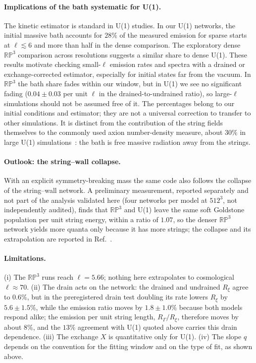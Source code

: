 \documentclass[prd,twocolumn,superscriptaddress,nofootinbib,amsmath,amssymb]{revtex4-2}
\newcommand{\RP}{\mathbb{RP}^3}
\newcommand{\RG}{R_\Gamma}
\newcommand{\Rxi}{R_\xi}
\begin{document}
\paragraph{Implications of the bath systematic for U(1).}
The kinetic estimator is standard in U(1) studies.
In our U(1) networks, the initial massive bath accounts for $28\%$ of the measured emission for sparse starts at $\ell\lesssim6$ and more than half in the dense comparison. The exploratory dense $\RP$ comparison across resolutions suggests a similar share to dense U(1). These results motivate checking small-$\ell$ emission rates and spectra with a drained or exchange-corrected estimator, especially for initial states far from the vacuum.
In $\RP$ the bath share fades within our window, but in U(1) we see no significant fading ($0.04\pm0.03$ per unit $\ell$ in the drained-to-undrained ratio), so large-$\ell$ simulations should not be assumed free of it. The percentages belong to our initial conditions and estimator; they are not a universal correction to transfer to other simulations.
It is distinct from the contribution of the string fields themselves to the commonly used axion number-density measure, about $30\%$ in large U(1) simulations~\cite{Correia2025spectrum}: the bath is free massive radiation away from the strings.

\paragraph{Outlook: the string--wall collapse.}
With an explicit symmetry-breaking mass the same code also follows the collapse of the string--wall network. A preliminary measurement, reported separately and not part of the analysis validated here (four networks per model at $512^3$, not independently audited), finds that $\RP$ and U(1) leave the same soft Goldstone population per unit string energy, within a ratio of $1.07$, so the denser $\RP$ network yields more quanta only because it has more strings; the collapse and its extrapolation are reported in Ref.~\cite{whalefall_repo}.

\paragraph{Limitations.}
(i) The $\RP$ runs reach $\ell=5.66$; nothing here extrapolates to cosmological $\ell\approx70$.
(ii) The drain acts on the network: the drained and undrained $\Rxi$ agree to $0.6\%$, but in the preregistered drain test doubling its rate lowers $\Rxi$ by $5.6\pm1.5\%$, while the emission ratio moves by $1.8\pm1.0\%$ because both models respond alike; the emission per unit string length, $\RG/\Rxi$, therefore moves by about $8\%$, and the $13\%$ agreement with U(1) quoted above carries this drain dependence.
(iii) The exchange $X$ is quantitative only for U(1).
(iv) The slope $q$ depends on the convention for the fitting window and on the type of fit, as shown above.
\end{document}
